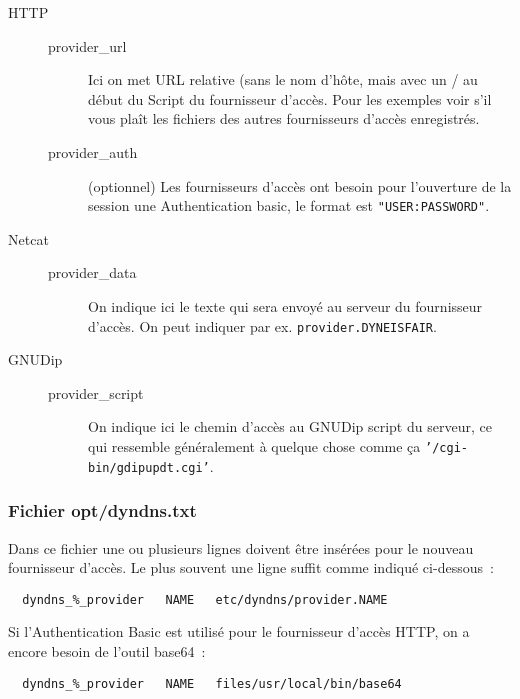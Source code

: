 \begin{description}
\item[HTTP]

\begin{description}
\item[provider\_url] Ici on met URL relative (sans le nom d'hôte, mais avec
  un / au début du Script du fournisseur d'accès. Pour les exemples voir
  s'il vous plaît les fichiers des autres fournisseurs d'accès enregistrés.
\item[provider\_auth] (optionnel) Les fournisseurs d'accès ont besoin pour
  l'ouverture de la session une Authentication basic, le format est
  \texttt{"{}USER:PASSWORD"{}}.
\end{description}

\item[Netcat]

\begin{description}
\item[provider\_data] On indique ici le texte qui sera envoyé au serveur du
  fournisseur d'accès. On peut indiquer par ex. \texttt{provider.DYNEISFAIR}.
\end{description}

\item[GNUDip]

\begin{description}
\item[provider\_script] On indique ici le chemin d'accès au GNUDip script du
  serveur, ce qui ressemble généralement à quelque chose comme ça
  \texttt{'/cgi-bin/gdipupdt.cgi'}.
\end{description}

\end{description}
\subsubsection{Fichier opt/dyndns.txt}

Dans ce fichier une ou plusieurs lignes doivent être insérées pour le nouveau fournisseur
d'accès. Le plus souvent une ligne suffit comme indiqué ci-dessous~:

\begin{verbatim}
  dyndns_%_provider   NAME   etc/dyndns/provider.NAME
\end{verbatim}

Si l'Authentication Basic est utilisé pour le fournisseur d'accès HTTP, on a
encore besoin de l'outil base64~:

\begin{verbatim}
  dyndns_%_provider   NAME   files/usr/local/bin/base64
\end{verbatim}

